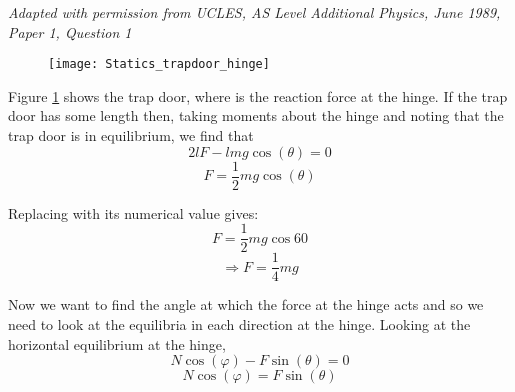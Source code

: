 
\begin{problem}[AS1989AddPQ1p] %
{
}
{\textit{Adapted with permission from UCLES, AS Level Additional Physics, June 1989, Paper 1, Question 1}}
{
\begin{figure}
	\centering
	\texttt{[image: Statics\_trapdoor\_hinge]}
	\caption{}
	\label{fig:Statics_trapdoor_hinge}
\end{figure}
Figure \ref{fig:Statics_trapdoor_hinge} shows the trap door, where  is the reaction force at the hinge. If the trap door has some length  then, taking moments about the hinge and noting that the trap door is in equilibrium, we find that
\begin{equation*}
2lF-lmg\cos(\theta)=0	
\end{equation*}
\begin{equation*}
F=\frac{1}{2}mg\cos(\theta)	
\end{equation*}

Replacing \vari{\theta} with its numerical value gives:
\begin{equation*}
F = \frac{1}{2}mg\cos{60}	
\end{equation*}
\begin{equation*}	
\Rightarrow F = \frac{1}{4}mg 	
\end{equation*}
	
Now we want to find the angle at which the force at the hinge acts and so we need to look at the equilibria in each direction at the hinge. Looking at the horizontal equilibrium at the hinge,
\begin{equation*}
N\cos(\varphi)-F\sin(\theta)=0	
\end{equation*}	
\begin{equation}
N\cos(\varphi)=F\sin(\theta)	 \label{eq:Statics_trapdoor_1}
\end{equation}	

}
\end{problem}
